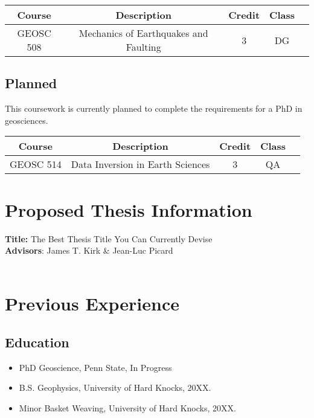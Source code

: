 \begin{table}[h]
	\begin{center}
	\begin{tabular}{|c | c | c | c | c |}
		\hline
                  \rowcolor[gray]{.85}
		Course&Description&Credit&Class\\
		\hline
		 GEOSC 508 & Mechanics of Earthquakes and Faulting & 3   & DG\\
                \hline
	\end{tabular}
	\end{center}
\end{table}

\subsection*{Planned}
This coursework is currently planned to complete the requirements for a PhD in geosciences.

\begin{table}[h]
	\begin{center}
	\begin{tabular}{|c | c | c | c | c |}
		\hline
                  \rowcolor[gray]{.85}
		Course&Description&Credit&Class\\
		\hline
		 GEOSC 514 & Data Inversion in Earth Sciences & 3  & QA\\
                \hline
	\end{tabular}
	\end{center}
\end{table}

\newpage

\section{Proposed Thesis Information}
\noindent \textbf{Title:} The Best Thesis Title You Can Currently Devise\\
\noindent \textbf{Advisors}: James T. Kirk \& Jean-Luc Picard \\ \\

\section{Previous Experience}

\subsection{Education}
\begin{itemize}
 \item PhD Geoscience, Penn State, In Progress
 \item B.S. Geophysics, University of Hard Knocks, 20XX.
 \item Minor Basket Weaving, University of Hard Knocks, 20XX.
\end{itemize}

